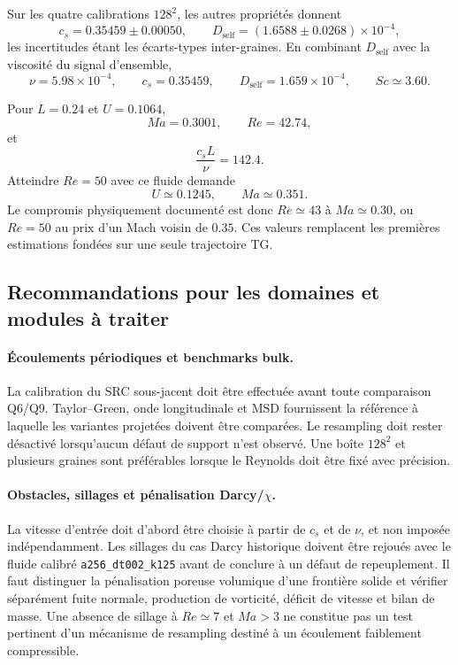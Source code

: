 \documentclass[11pt,a4paper]{article}
\begin{document}
Sur les quatre calibrations $128^2$, les autres propriétés donnent
\begin{equation}
  c_s=0.35459\pm0.00050,
  \qquad
  D_{\mathrm{self}}=(1.6588\pm0.0268)\times10^{-4},
\end{equation}
les incertitudes étant les écarts-types inter-graines. En combinant $D_{\mathrm{self}}$ avec la viscosité du signal d'ensemble,
\begin{equation}
  \boxed{\nu=5.98\times10^{-4}},\qquad
  \boxed{c_s=0.35459},\qquad
  \boxed{D_{\mathrm{self}}=1.659\times10^{-4}},\qquad
  \boxed{Sc\simeq3.60}.
\end{equation}

Pour $L=0.24$ et $U=0.1064$,
\begin{equation}
  Ma=0.3001,\qquad Re=42.74,
\end{equation}
et
\begin{equation}
  \frac{c_sL}{\nu}=142.4.
\end{equation}
Atteindre $Re=50$ avec ce fluide demande
\begin{equation}
  U\simeq0.1245,\qquad Ma\simeq0.351.
\end{equation}
Le compromis physiquement documenté est donc $Re\simeq43$ à $Ma\simeq0.30$, ou $Re=50$ au prix d'un Mach voisin de $0.35$. Ces valeurs remplacent les premières estimations fondées sur une seule trajectoire TG.

\subsection{Recommandations pour les domaines et modules à traiter}

\paragraph{Écoulements périodiques et benchmarks bulk.}
La calibration du SRC sous-jacent doit être effectuée avant toute comparaison Q6/Q9. Taylor--Green, onde longitudinale et MSD fournissent la référence à laquelle les variantes projetées doivent être comparées. Le resampling doit rester désactivé lorsqu'aucun défaut de support n'est observé. Une boîte $128^2$ et plusieurs graines sont préférables lorsque le Reynolds doit être fixé avec précision.

\paragraph{Obstacles, sillages et pénalisation Darcy/$\chi$.}
La vitesse d'entrée doit d'abord être choisie à partir de $c_s$ et de $\nu$, et non imposée indépendamment. Les sillages du cas Darcy historique doivent être rejoués avec le fluide calibré \texttt{a256\_dt002\_k125} avant de conclure à un défaut de repeuplement. Il faut distinguer la pénalisation poreuse volumique d'une frontière solide et vérifier séparément fuite normale, production de vorticité, déficit de vitesse et bilan de masse. Une absence de sillage à $Re\simeq7$ et $Ma>3$ ne constitue pas un test pertinent d'un mécanisme de resampling destiné à un écoulement faiblement compressible.
\end{document}
